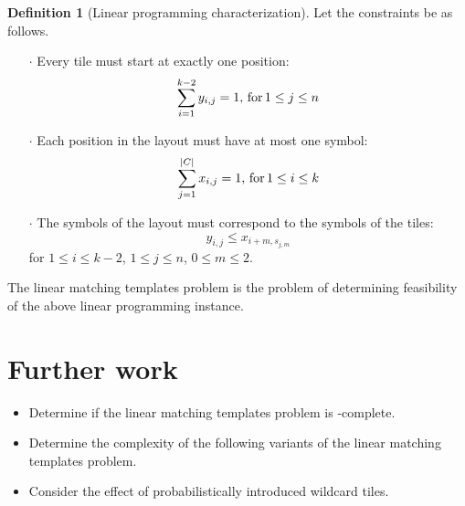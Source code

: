 \documentclass{lposter}
\theoremstyle{definition} \newtheorem*{definition}{Definition}
\begin{document}
\begin{poster}
\begin{shaded}
\begin{definition}[Linear programming characterization]
  Let the constraints be as follows.
  \begin{itemize}
  \item[$\cdot$] Every tile must start at exactly one position:
    \begin{displaymath}
      \sum_{i = 1}^{k - 2}{y_{i, j}} = 1,\,\textnormal{for}\, 1\leq j\leq n
    \end{displaymath}
  \item[$\cdot$] Each position in the layout must have at most one symbol:
    \begin{displaymath}
      \sum_{j = 1}^{|C|}{x_{i, j}} = 1,\,\textnormal{for}\, 1\leq i\leq k
    \end{displaymath}
  \item[$\cdot$] The symbols of the layout must correspond to the symbols of
    the tiles:
    \begin{displaymath}
      y_{i, j} \leq x_{i + m, s_{j, m}}
    \end{displaymath}
    for $1\leq i\leq k - 2$, $1\leq j\leq n$, $0\leq m\leq 2$.
  \end{itemize}
    
  The linear matching templates problem is the problem of determining
  feasibility of the above linear programming instance.
\end{definition}
\end{shaded}

\section{Further work}

\begin{itemize}
\item Determine if the linear matching templates problem is \NP-complete.
\item Determine the complexity of the following variants of the linear matching
  templates problem.
\item Consider the effect of probabilistically introduced wildcard tiles.
\end{itemize}
%

\end{poster}
\end{document}
